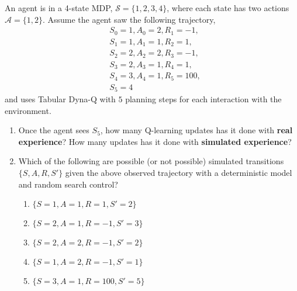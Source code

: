 An agent is in a 4-state MDP, $\mathcal{S} = \{1,2,3,4\}$, where each state has two actions $\mathcal{A} = \{1,2\}$.
Assume the agent saw the following trajectory,
\begin{align*}
  & S_{0} = 1, A_{0} = 2, R_{1} = -1,\\
  &S_{1} = 1, A_{1} = 1, R_{2} = 1, \\
  &S_{2} = 2, A_{2} = 2, R_{3} = -1, \\
  & S_{3} = 2, A_{3} = 1, R_{4} = 1, \\ 
  & S_{4} = 3, A_{4} = 1, R_{5} = 100, \\
  &S_{5} = 4
  \end{align*}
and uses Tabular Dyna-Q with $5$ planning steps for each interaction with the environment.

\begin{enumerate}
  \item Once the agent sees $S_{5}$, how many Q-learning updates has it done with \textbf{real experience}? How many updates has it done with \textbf{simulated experience}?
  \item Which of the following are possible (or not possible) simulated transitions $\{S, A, R, S'\}$ given the above observed trajectory with a deterministic model and random search control?
    \begin{enumerate}
      \item $\{S = 1, A = 1, R = 1 , S' = 2\}$ %
      \item $\{S = 2, A = 1, R = -1 , S' = 3\}$ %
      \item $\{S = 2, A = 2, R = -1 , S' = 2\}$ %
      \item $\{S = 1, A = 2, R = -1 , S' = 1\}$ %
      \item $\{S = 3, A = 1, R = 100, S' = 5\}$ %
    \end{enumerate}
\end{enumerate}

